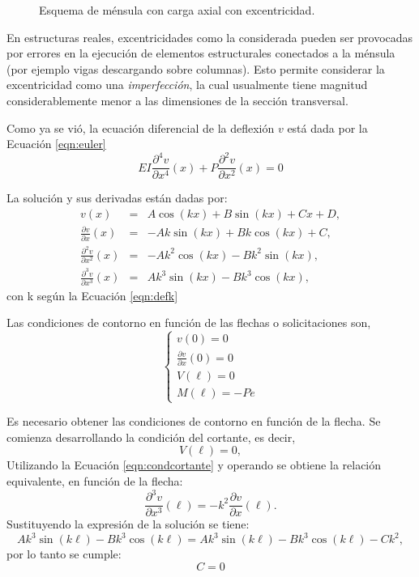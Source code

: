 \begin{figure}[htb]
\centering
\def\svgwidth{0.5\textwidth}

\caption{Esquema de ménsula con carga axial con excentricidad.}
\label{fig:esqpand}
\end{figure}

En estructuras reales, excentricidades como la considerada pueden ser provocadas por errores en la ejecución de elementos estructurales conectados a la ménsula (por ejemplo vigas descargando sobre columnas). %
%
Esto permite considerar la excentricidad como una \textit{imperfección}, la cual usualmente tiene magnitud considerablemente menor a las dimensiones de la sección transversal. %

Como ya se vió, la ecuación diferencial de la deflexión $v$ está dada por la Ecuación \eqref{eqn:euler}
$$
  E I \frac{\partial^4 v}{\partial x^4}(x)
+   P \frac{\partial^2 v}{\partial x^2}(x)
=   0
$$

La solución y sus derivadas están dadas por:
\begin{eqnarray}
v(x) &=& A \cos(k x ) + B \sin(kx) + C x + D, \\
\frac{\partial   v}{\partial x  } (x) &=& -A k \sin(k x ) + B k \cos(kx) + C , \\
\frac{\partial^2 v}{\partial x^2} (x) &=& - A k^2 \cos(k x ) - B k^2 \sin(kx),  \\
\frac{\partial^3 v}{\partial x^3} (x) &=& A k^3 \sin(k x ) - B k^3 \cos(kx), 
\end{eqnarray}
con k según la Ecuación \eqref{eqn:defk}

Las condiciones de contorno en función de las flechas o solicitaciones son,
\begin{equation}
\left\{
\begin{array}{l}
v(0)=0 \\[.5em]
\displaystyle \frac{\partial v}{\partial x}(0)=0\\[1em]
V(\ell)=0\\[.5em]
M(\ell)=-P e
\end{array}
\right.
\end{equation}

Es necesario obtener las condiciones de contorno en función de la flecha. %
Se comienza desarrollando la condición del cortante, es decir,
%
\begin{equation}
	V(\ell) = 0,
\end{equation}
Utilizando la Ecuación \eqref{eqn:condcortante} y operando se obtiene la relación equivalente, en función de la flecha:
%
\begin{equation}
  \frac{\partial^3 v}{\partial x^3} (\ell) = - k^2 \frac{\partial v}{\partial x}(\ell).
\end{equation}
%
Sustituyendo la expresión de la solución se tiene:
%	
\begin{equation}
	Ak^3 \sin(k\ell) - Bk^3 \cos(k\ell) = Ak^3 \sin(k\ell) - Bk^3 \cos(k\ell) - C k^2,
\end{equation}
por lo tanto se cumple:
\begin{equation}\label{eqn:ejemplopand}
\boxed{
  C=0
}
\end{equation}

